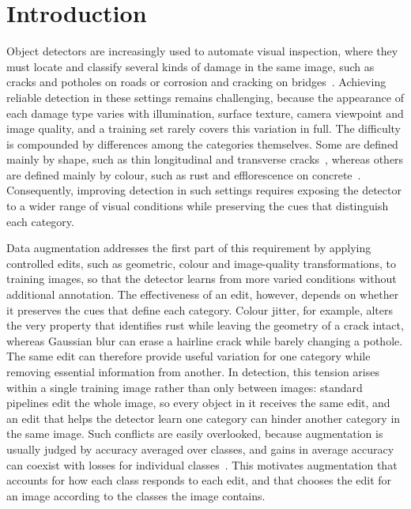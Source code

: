 \section{Introduction}
\label{sec:intro}

Object detectors are increasingly used to automate visual inspection, where they must locate and classify several kinds of damage in the same image, such as cracks and potholes on roads or corrosion and cracking on bridges~\cite{shang2024automated,zheng2024deep,vision2025inspection}. Achieving reliable detection in these settings remains challenging, because the appearance of each damage type varies with illumination, surface texture, camera viewpoint and image quality, and a training set rarely covers this variation in full. The difficulty is compounded by differences among the categories themselves. Some are defined mainly by shape, such as thin longitudinal and transverse cracks~\cite{arya2024rdd}, whereas others are defined mainly by colour, such as rust and efflorescence on concrete~\cite{flotzinger2024dacl10k}. Consequently, improving detection in such settings requires exposing the detector to a wider range of visual conditions while preserving the cues that distinguish each category.

Data augmentation addresses the first part of this requirement by applying controlled edits, such as geometric, colour and image-quality transformations, to training images, so that the detector learns from more varied conditions without additional annotation. The effectiveness of an edit, however, depends on whether it preserves the cues that define each category. Colour jitter, for example, alters the very property that identifies rust while leaving the geometry of a crack intact, whereas Gaussian blur can erase a hairline crack while barely changing a pothole. The same edit can therefore provide useful variation for one category while removing essential information from another. In detection, this tension arises within a single training image rather than only between images: standard pipelines edit the whole image, so every object in it receives the same edit, and an edit that helps the detector learn one category can hinder another category in the same image. Such conflicts are easily overlooked, because augmentation is usually judged by accuracy averaged over classes, and gains in average accuracy can coexist with losses for individual classes~\cite{kirichenko2023}. This motivates augmentation that accounts for how each class responds to each edit, and that chooses the edit for an image according to the classes the image contains.

